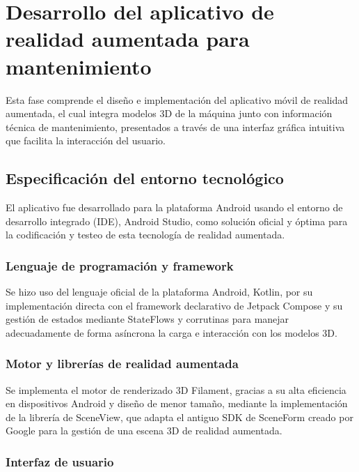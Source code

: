 \section{Desarrollo del aplicativo de realidad aumentada para mantenimiento}

    Esta fase comprende el diseño e implementación del aplicativo móvil de realidad aumentada, el cual integra modelos 3D de la máquina junto con información técnica de mantenimiento, presentados a través de una interfaz gráfica intuitiva que facilita la interacción del usuario.

    \subsection{Especificación del entorno tecnológico}

        El aplicativo fue desarrollado para la plataforma Android usando el entorno de desarrollo integrado (IDE), Android Studio, como solución oficial y óptima para la codificación y testeo de esta tecnología de realidad aumentada.

        \subsubsection{Lenguaje de programación y framework}

            Se hizo uso del lenguaje oficial de la plataforma Android, Kotlin, por su implementación directa con el framework declarativo de Jetpack Compose y su gestión de estados mediante StateFlows y corrutinas para manejar adecuadamente de forma asíncrona la carga e interacción con los modelos 3D.

        \subsubsection{Motor y librerías de realidad aumentada}

            Se implementa el motor de renderizado 3D Filament, gracias a su alta eficiencia en dispositivos Android y diseño de menor tamaño, mediante la implementación de la librería de SceneView, que adapta el antiguo SDK de SceneForm creado por Google para la gestión de una escena 3D de realidad aumentada.


        \subsubsection{Interfaz de usuario}

